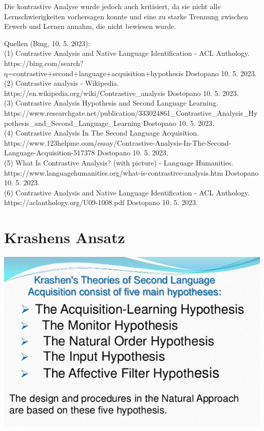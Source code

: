 \documentclass[
  letterpaper,
]{scrbook}
\begin{document}
Die kontrastive Analyse wurde jedoch auch kritisiert, da sie nicht alle
Lernschwierigkeiten vorhersagen konnte und eine zu starke Trennung
zwischen Erwerb und Lernen annahm, die nicht bewiesen wurde.

Quellen (Bing, 10. 5. 2023):\\
(1) Contrastive Analysis and Native Language Identiﬁcation - ACL
Anthology.
https://bing.com/search?q=contrastive+second+language+acquisition+hypothesis
Dostopano 10. 5. 2023.\\
(2) Contrastive analysis - Wikipedia.
https://en.wikipedia.org/wiki/Contrastive\_analysis Dostopano 10. 5.
2023.\\
(3) Contrastive Analysis Hypothesis and Second Language Learning.
https://www.researchgate.net/publication/333024861\_Contrastive\_Analysis\_Hypothesis\_and\_Second\_Language\_Learning
Dostopano 10. 5. 2023.\\
(4) Contrastive Analysis In The Second Language Acquisition.
https://www.123helpme.com/essay/Contrastive-Analysis-In-The-Second-Language-Acquisition-517378
Dostopano 10. 5. 2023.\\
(5) What Is Contrastive Analysis? (with picture) - Language Humanities.
https://www.languagehumanities.org/what-is-contrastive-analysis.htm
Dostopano 10. 5. 2023.\\
(6) Contrastive Analysis and Native Language Identiﬁcation - ACL
Anthology. https://aclanthology.org/U09-1008.pdf Dostopano 10. 5. 2023.

\hypertarget{krashens-ansatz}{%
\section{Krashens Ansatz}\label{krashens-ansatz}}

\includegraphics[width=1\textwidth,height=\textheight]{./pictures/krashens_5_hypotheses.png}
\end{document}
